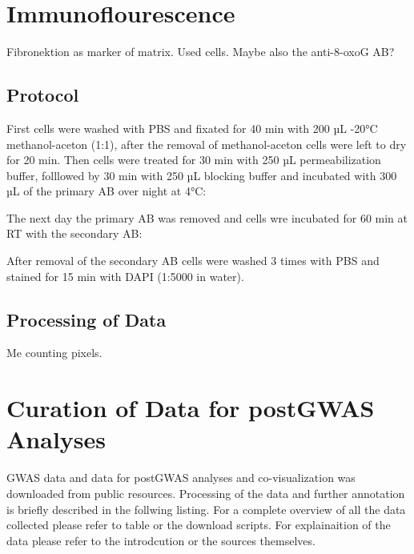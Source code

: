 \section{Immunoflourescence}
\label{sec:if}
Fibronektion as marker of matrix. Used cells.
Maybe also the anti-8-oxoG AB?

    \subsection{Protocol}
    First cells were washed with PBS and fixated for 40 min with 200 µL -20°C methanol-aceton (1:1), after the removal of methanol-aceton cells were left to dry for 20 min. Then cells were treated for 30 min with 250 µL permeabilization buffer, folllowed by 30 min with 250 µL blocking buffer and incubated with 300 µL of the primary AB over night at 4°C:

    The next day the primary AB was removed and cells wre incubated for 60 min at RT with the secondary AB:

    After removal of the secondary AB cells were washed 3 times with PBS and stained for 15 min with DAPI (1:5000 in water).

    \subsection{Processing of Data}
    Me counting pixels.

\section{Curation of Data for postGWAS Analyses}
\label{sec:database}
GWAS data and data for postGWAS analyses and co-visualization was downloaded from public resources. Processing of the data and further annotation is briefly described in the follwing listing. For a complete overview of all the data collected please refer to table or the download scripts. For explainaition of the data please refer to the introdcution or the sources themselves.

